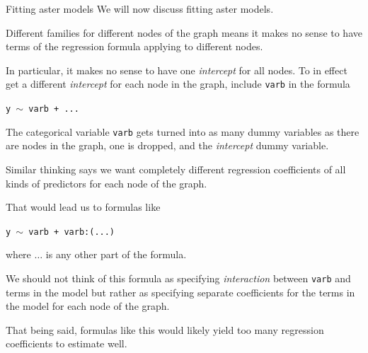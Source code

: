 \documentclass[
  ignorenonframetext,
]{beamer}
\begin{document}
\begin{frame}{Fitting aster models}
\protect\hypertarget{fitting-aster-models}{}
We will now discuss fitting aster models.

Different families for different nodes of the graph means it makes no
sense to have terms of the regression formula applying to different
nodes.

In particular, it makes no sense to have one \emph{intercept} for all
nodes. To in effect get a different \emph{intercept} for each node in
the graph, include \texttt{varb} in the formula

\begin{center}
  \texttt{y $\sim$ varb + ...}
\end{center}

The categorical variable \texttt{varb} gets turned into as many dummy
variables as there are nodes in the graph, one is dropped, and the
\emph{intercept} dummy variable.
\end{frame}

\begin{frame}{}
\protect\hypertarget{section-15}{}
Similar thinking says we want completely different regression
coefficients of all kinds of predictors for each node of the graph.

That would lead us to formulas like

\begin{center}
  \texttt{y $\sim$ varb + varb:(...)}
\end{center}

where \(\ldots\) is any other part of the formula.

We should not think of this formula as specifying \emph{interaction}
between \texttt{varb} and terms in the model but rather as specifying
separate coefficients for the terms in the model for each node of the
graph.

That being said, formulas like this would likely yield too many
regression coefficients to estimate well.
\end{frame}
\end{document}
